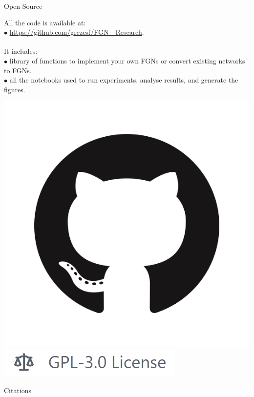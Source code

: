 \documentclass{beamer}
\begin{document}
\begin{frame}{Open Source}
    
    \begin{block}{}
    All the code is available at:\\
    \quad $\bullet$ \url{https://github.com/grezesf/FGN---Research}.\\
    ~\\
    It includes:\\
    \quad $\bullet$ library of functions to implement your own FGNs or convert existing networks to FGNs.\\
    \quad $\bullet$ all the notebooks used to run experiments, analyse results, and generate the figures.

    \end{block}
    \centering
    \includegraphics[width=.08\textheight]{images/misc/GitHub-Mark.png} 
    \includegraphics[width=.4\textheight]{images/misc/gpl3.PNG}
    
    
\end{frame}


\begin{frame}[allowframebreaks]{Citations}
    \printbibliography

\end{frame}
\end{document}
